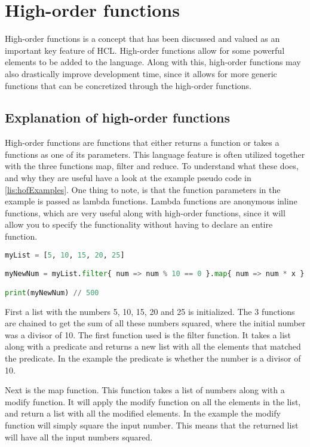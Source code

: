 \section{High-order functions}

High-order functions is a concept that has been discussed and valued as an important key feature of HCL.
High-order functions allow for some powerful elements to be added to the language.
Along with this, high-order functions may also drastically improve development time, since it allows for more generic functions that can be concretized through the high-order functions.

\subsection{Explanation of high-order functions}
High-order functions are functions that either returns a function or takes a functions as one of its parameters. 
This language feature is often utilized together with the three functions map, filter and reduce. 
To understand what these does, and why they are useful have a look at the example pseudo code in \ref{lis:hofExamples}. 
One thing to note, is that the function parameters in the example is passed as lambda functions. 
Lambda functions are anonymous inline functions, which are very useful along with high-order functions, since it will allow you to specify the functionality without having to declare an entire function.

\begin{lstlisting}[language=Python,label=lis:hofExamples,caption=An example of the map\, filter and reduce functions.,firstnumber=1]
myList = [5, 10, 15, 20, 25]

myNewNum = myList.filter{ num => num % 10 == 0 }.map{ num => num * x }.reduce{ sumOfNums, num => sumOfNums + num }

print(myNewNum) // 500
\end{lstlisting}

First a list with the numbers 5, 10, 15, 20 and 25 is initialized. 
The 3 functions are chained to get the sum of all these numbers squared, where the initial number was a divisor of 10.
The first function used is the filter function. 
It takes a list along with a predicate and returns a new list with all the elements that matched the predicate.
In the example the predicate is whether the number is a divisor of 10.

Next is the map function. 
This function takes a list of numbers along with a modify function. 
It will apply the modify function on all the elements in the list, and return a list with all the modified elements.
In the example the modify function will simply square the input number. 
This means that the returned list will have all the input numbers squared.


